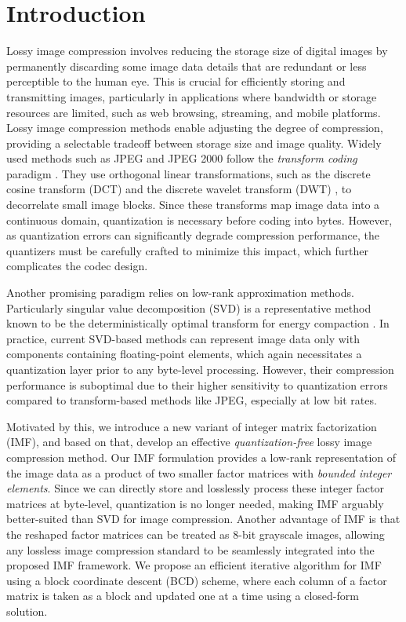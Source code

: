 \section{Introduction} \label{sec: introduction}

Lossy image compression involves reducing the storage size of digital images by permanently discarding some image data details that are redundant or less perceptible to the human eye. This is crucial for efficiently storing and transmitting images, particularly in applications where bandwidth or storage resources are limited, such as web browsing, streaming, and mobile platforms. Lossy image compression methods enable adjusting the degree of compression, providing a selectable tradeoff between storage size and image quality. Widely used methods such as JPEG \cite{wallace1991jpeg} and JPEG 2000 \cite{skodras2001jpeg} follow the \emph{transform coding} paradigm \cite{goyal2001theoretical}. They use orthogonal linear transformations, such as the discrete cosine transform (DCT) \cite{ahmed1974discrete} and the discrete wavelet transform (DWT) \cite{antonini1992image}, to decorrelate small image blocks. Since these transforms map image data into a continuous domain, quantization is necessary before coding into bytes. However, as quantization errors can significantly degrade compression performance, the quantizers must be carefully crafted to minimize this impact, which further complicates the codec design.

Another promising paradigm relies on low-rank approximation methods. Particularly singular value decomposition (SVD) is a representative method known to be the deterministically optimal transform for energy compaction \cite{andrews1976singular}. In practice, current SVD-based methods \cite{andrews1976singular, prasantha2007image, hou2015sparse} can represent image data only with components containing floating-point elements, which again necessitates a quantization layer prior to any byte-level processing. However, their compression performance is suboptimal due to their higher sensitivity to quantization errors compared to transform-based methods like JPEG, especially at low bit rates.

Motivated by this, we introduce a new variant of integer matrix factorization (IMF), and based on that, develop an effective \emph{quantization-free} lossy image compression method. Our IMF formulation provides a low-rank representation of the image data as a product of two smaller factor matrices with \emph{bounded integer elements}. Since we can directly store and losslessly process these integer factor matrices at byte-level, quantization is no longer needed, making IMF arguably better-suited than SVD for image compression. Another advantage of IMF is that the reshaped factor matrices can be treated as 8-bit grayscale images, allowing any lossless image compression standard to be seamlessly integrated into the proposed IMF framework. We propose an efficient iterative algorithm for IMF using a block coordinate descent (BCD) scheme, where each column of a factor matrix is taken as a block and updated one at a time using a closed-form solution. 
 
